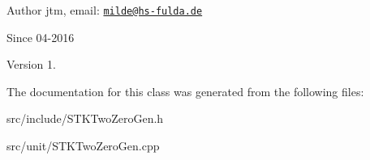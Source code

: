 \begin{DoxyAuthor}{Author}
jtm, email\-:  \href{mailto:milde@hs-fulda.de}{\tt milde@hs-\/fulda.\-de} 
\end{DoxyAuthor}
\begin{DoxySince}{Since}
04-\/2016 
\end{DoxySince}
\begin{DoxyVersion}{Version}
1. 
\end{DoxyVersion}


The documentation for this class was generated from the following files\-:\begin{DoxyCompactItemize}
\item 
src/include/S\-T\-K\-Two\-Zero\-Gen.\-h\item 
src/unit/S\-T\-K\-Two\-Zero\-Gen.\-cpp\end{DoxyCompactItemize}
